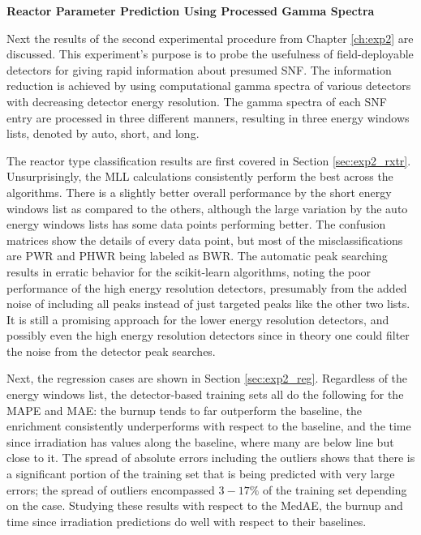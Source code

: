 \noindent \textbf{Reactor Parameter Prediction Using Processed Gamma Spectra}

Next the results of the second experimental procedure from Chapter
\ref{ch:exp2} are discussed.  This experiment's purpose is to probe the
usefulness of field-deployable detectors for giving rapid information about
presumed \gls{SNF}. The information reduction is achieved by using
computational gamma spectra of various detectors with decreasing detector
energy resolution.  The gamma spectra of each \gls{SNF} entry are
processed in three different manners, resulting in three energy windows lists,
denoted by auto, short, and long.  

The reactor type classification results are first covered in Section
\ref{sec:exp2_rxtr}.  Unsurprisingly, the \gls{MLL} calculations consistently
perform the best across the algorithms. There is a slightly better overall
performance by the short energy windows list as compared to the others,
although the large variation by the auto energy windows lists has some data
points performing better.  The confusion matrices show the details of every
data point, but most of the misclassifications are \gls{PWR} and \gls{PHWR} being
labeled as \gls{BWR}.  The automatic peak searching results in erratic behavior
for the scikit-learn algorithms, noting the poor performance of the high energy
resolution detectors, presumably from the added noise of including all peaks
instead of just targeted peaks like the other two lists.  It is still a
promising approach for the lower energy resolution detectors, and possibly even
the high energy resolution detectors since in theory one could filter the noise
from the detector peak searches. 

Next, the regression cases are shown in Section \ref{sec:exp2_reg}.  Regardless
of the energy windows list, the detector-based training sets all do the
following for the \gls{MAPE} and \gls{MAE}: the burnup tends to far outperform
the baseline, the enrichment consistently underperforms with respect to the
baseline, and the time since irradiation has values along the baseline, where
many are below line but close to it.  The spread of absolute errors including
the outliers shows that there is a significant portion of the training set that
is being predicted with very large errors; the spread of outliers encompassed
$3-17\%$ of the training set depending on the case.  Studying these results
with respect to the \gls{MedAE}, the burnup and time since irradiation
predictions do well with respect to their baselines.

